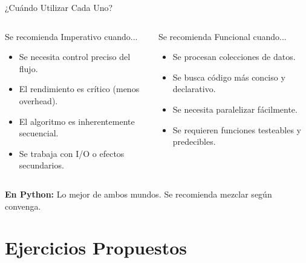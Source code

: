 \documentclass[aspectratio=169]{beamer}
\begin{document}
\begin{frame}{¿Cuándo Utilizar Cada Uno?}
    \begin{columns}[t]
        \begin{alertblock}{Se recomienda Imperativo cuando...}
            \begin{itemize}
                \item Se necesita control preciso del flujo.
                \item El rendimiento es crítico (menos overhead).
                \item El algoritmo es inherentemente secuencial.
                \item Se trabaja con I/O o efectos secundarios.
            \end{itemize}
        \end{alertblock}
        
        \begin{exampleblock}{Se recomienda Funcional cuando...}
            \begin{itemize}
                \item Se procesan colecciones de datos.
                \item Se busca código más conciso y declarativo.
                \item Se necesita paralelizar fácilmente.
                \item Se requieren funciones testeables y predecibles.
            \end{itemize}
        \end{exampleblock}
    \end{columns}
    
    \vspace{0.5cm}
    \centering
    \textbf{En Python:} Lo mejor de ambos mundos. Se recomienda mezclar según convenga.
\end{frame}

\section{Ejercicios Propuestos}
\end{document}
